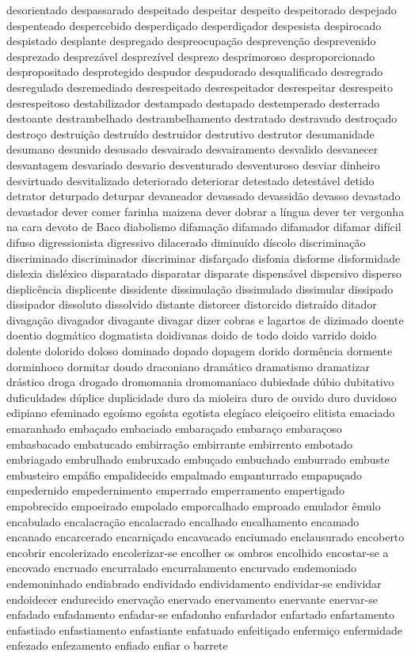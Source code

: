 desorientado despassarado despeitado despeitar despeito despeitorado despejado despenteado despercebido desperdi\c{c}ado desperdi\c{c}ador despesista despirocado despistado desplante despregado despreocupa\c{c}\~ao despreven\c{c}\~ao desprevenido desprezado desprez\'{a}vel desprez\'{i}vel desprezo desprimoroso desproporcionado despropositado desprotegido despudor despudorado desqualificado desregrado desregulado desremediado desrespeitado desrespeitador desrespeitar desrespeito desrespeitoso destabilizador destampado destapado destemperado desterrado destoante destrambelhado destrambelhamento destratado destravado destro\c{c}ado destro\c{c}o destrui\c{c}\~ao destru\'{i}do destruidor destrutivo destrutor desumanidade desumano desunido desusado desvairado desvairamento desvalido desvanecer desvantagem desvariado desvario desventurado desventuroso desviar dinheiro desvirtuado desvitalizado deteriorado deteriorar detestado detest\'{a}vel detido detrator deturpado deturpar devaneador devassado devassid\~ao devasso devastado devastador dever comer farinha maizena dever dobrar a l\'{i}ngua dever ter vergonha na cara devoto de Baco diabolismo difama\c{c}\~ao difamado difamador difamar dif\'{i}cil difuso digressionista digressivo dilacerado diminu\'{i}do d\'{i}scolo discrimina\c{c}\~ao discriminado discriminador discriminar disfar\c{c}ado disfonia disforme disformidade dislexia disl\'{e}xico disparatado disparatar disparate dispens\'{a}vel dispersivo disperso displic\^{e}ncia displicente dissidente dissimula\c{c}\~ao dissimulado dissimular dissipado dissipador dissoluto dissolvido distante distorcer distorcido distra\'{i}do ditador divaga\c{c}\~ao divagador divagante divagar dizer cobras e lagartos de dizimado doente doentio dogm\'{a}tico dogmatista doidivanas doido de todo doido varrido doido dolente dolorido doloso dominado dopado dopagem dorido dorm\^{e}ncia dormente dorminhoco dormitar doudo draconiano dram\'{a}tico dramatismo dramatizar dr\'{a}stico droga drogado dromomania dromoman\'{i}aco dubiedade d\'{u}bio dubitativo duficuldades d\'{u}plice duplicidade duro da mioleira duro de ouvido duro duvidoso edipiano efeminado ego\'{i}smo ego\'{i}sta egotista eleg\'{i}aco elei\c{c}oeiro elitista emaciado emaranhado emba\c{c}ado embaciado embara\c{c}ado embara\c{c}o embara\c{c}oso embasbacado embatucado embirra\c{c}\~ao embirrante embirrento embotado embriagado embrulhado embruxado embu\c{c}ado embuchado emburrado embuste embusteiro emp\'{a}fio empalidecido empalmado empanturrado empapu\c{c}ado empedernido empedernimento emperrado emperramento empertigado empobrecido empoeirado empolado emporcalhado emproado emulador \^{e}mulo encabulado encalacra\c{c}\~ao encalacrado encalhado encalhamento encamado encanado encarcerado encarni\c{c}ado encavacado enciumado enclausurado encoberto encobrir encolerizado encolerizar-se encolher os ombros encolhido encostar-se a encovado encruado encurralado encurralamento encurvado endemoniado endemoninhado endiabrado endividado endividamento endividar-se endividar endoidecer endurecido enerva\c{c}\~ao enervado enervamento enervante enervar-se enfadado enfadamento enfadar-se enfadonho enfardador enfartado enfartamento enfastiado enfastiamento enfastiante enfatuado enfeiti\c{c}ado enfermi\c{c}o enfermidade enfezado enfezamento enfiado enfiar o barrete 